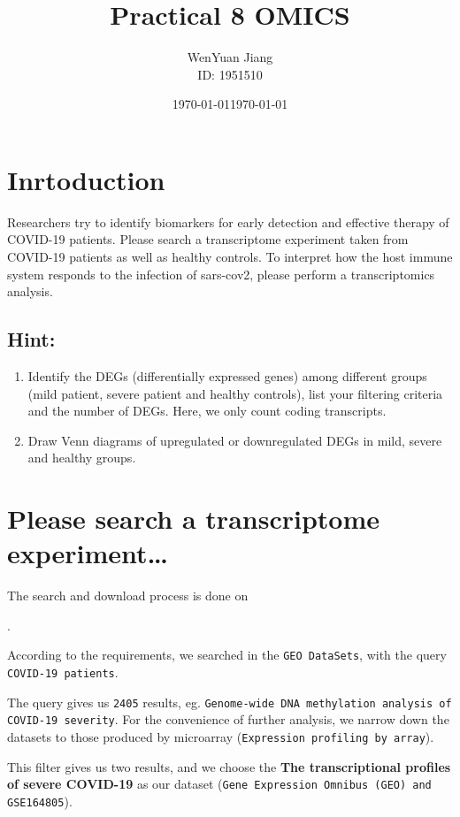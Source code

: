 \documentclass[en,black,12pt,normal]{elegantnote}
\title{Practical 8 OMICS}
\author{WenYuan Jiang\\ID: 1951510}
\institute{School of Life Science, Tongji University}
\date{\today}
\newcommand{\upcite}[1]{\textsuperscript{\textsuperscript{\cite{#1}}}}
\begin{document}
\maketitle

\section{Inrtoduction}

Researchers try to identify biomarkers for early detection and effective therapy of COVID-19 patients. 
Please search a transcriptome experiment taken from COVID-19 patients as well as healthy controls. 
To interpret how the host immune system responds to the infection of sars-cov2, please perform a transcriptomics analysis.

\subsection*{Hint:}

\begin{enumerate}
    \item Identify the DEGs (differentially expressed genes) among different groups (mild patient, 
    severe patient and healthy controls), list your filtering criteria and the number of DEGs. 
    Here, we only count coding transcripts.
    \item Draw Venn diagrams of upregulated or downregulated DEGs in mild, severe and healthy groups.
\end{enumerate}



\section{Please search a transcriptome experiment\dots}

The search and download process is done on \date{\today}.

According to the requirements, we searched in the \lstinline{GEO DataSets}, with the query \lstinline{COVID-19 patients}.

The query gives us \lstinline{2405} results, eg. \lstinline{Genome-wide DNA methylation analysis of COVID-19 severity}. 
For the convenience of further analysis, 
we narrow down the datasets to those produced by microarray (\lstinline{Expression profiling by array}).

This filter gives us two results, and we choose the \textbf{The transcriptional profiles of severe COVID-19}
as our dataset (\lstinline{Gene Expression Omnibus (GEO) and GSE164805}).\upcite{barrett2012ncbi}
\end{document}
